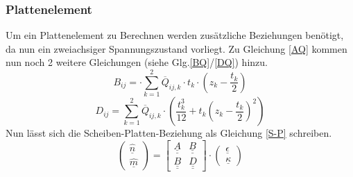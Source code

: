 \subsubsection{Plattenelement}
Um ein Plattenelement zu Berechnen werden zusätzliche Beziehungen benötigt, da nun ein zweiachsiger Spannungszustand vorliegt. Zu Gleichung \ref{AQ} kommen nun noch 2 weitere Gleichungen (siehe Glg.\ref{BQ}/\ref{DQ}) hinzu.
\begin{equation}
\label{BQ}
	B_{ij}= \cdot \sum_{k=1}^{2} \overline{Q}_{ij,k}\cdot t_{k}\cdot \left(z_{k}-\frac{t_{k}}{2}\right)
\end{equation}
\begin{equation}
\label{DQ} 
	D_{ij}=\sum_{k=1}^{2} \overline{Q}_{ij,k}\cdot \left(\frac{t_{k}^{3}}{12}+t_{k}\left(z_{k}-\frac{t_{k}}{2}\right)^{2}\right)
\end{equation}
\noindent
Nun lässt sich die Scheiben-Platten-Beziehung als Gleichung \ref{S-P} schreiben.\cite{item3}
\begin{equation}
\label{S-P}
	\begin{pmatrix}
		\hat{\underline{n}}\\
		\hat{\underline{m}}
	\end{pmatrix}
	= \begin{bmatrix}
		\underline{\underline{A}}&\underline{\underline{B}}\\
		\underline{\underline{B}}&\underline{\underline{D}}
	\end{bmatrix}
	\cdot \begin{pmatrix}
		\underline{\epsilon}\\
		\underline{\kappa}
	\end{pmatrix}
\end{equation}\\



